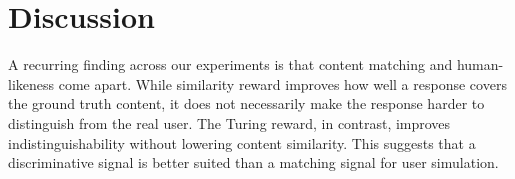 \documentclass{article} %
\newcommand{\subtle}[1]{{\tiny\color[gray]{0.4}#1}}
\newcommand{\llq}[1]{{\color{cyan}[linlu: #1]}}
\begin{document}

\section{Discussion}
\label{sec:discussion}
A recurring finding across our experiments is that content matching and human-likeness come apart. While similarity reward improves how well a response covers the ground truth content, it does not necessarily make the response harder to distinguish from the real user. The Turing reward, in contrast, improves indistinguishability without lowering content similarity. This suggests that a discriminative signal is better suited than a matching signal for user simulation.
\end{document}
